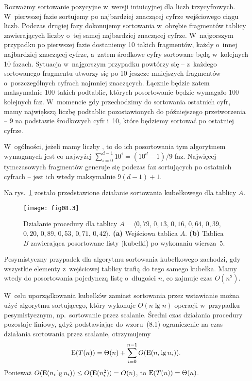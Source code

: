 \exercise %
Rozważmy sortowanie pozycyjne w~wersji intuicyjnej dla liczb trzycyfrowych. W~pierwszej fazie sortujemy po najbardziej znaczącej cyfrze wejściowego ciągu liczb. Podczas drugiej fazy dokonujemy sortowania w~obrębie fragmentów tablicy zawierających liczby o~tej samej najbardziej znaczącej cyfrze. W~najgorszym przypadku po pierwszej fazie dostaniemy 10 takich fragmentów, każdy o~innej najbardziej znaczącej cyfrze, a~zatem środkowe cyfry sortowane będą w~kolejnych 10 fazach. Sytuacja w~najgorszym przypadku powtórzy się -- z~każdego sortowanego fragmentu utworzy się po 10 jeszcze mniejszych fragmentów o~poszczególnych cyfrach najmniej znaczących. Łącznie będzie zatem maksymalnie 100 takich podtablic, których posortowanie będzie wymagało 100 kolejnych faz. W~momencie gdy przechodzimy do sortowania ostatnich cyfr, mamy największą liczbę podtablic pozostawionych do późniejszego przetworzenia -- 9 na podstawie środkowych cyfr i~10, które będziemy sortować po ostatniej cyfrze.

W~ogólności, jeżeli mamy liczby , to do ich posortowania tym algorytmem wymaganych jest co najwyżej $\sum_{i=0}^{d-1}10^i=(10^d-1)/9$ faz. Najwięcej tymczasowych fragmentów generuje się podczas faz sortujących po ostatnich cyfrach -- jest ich wtedy maksymalnie $9(d-1)+1$.


\exercise %
Na rys.~\ref{fig:8.4-1} zostało przedstawione działanie sortowania kubełkowego dla tablicy $A$.
\begin{figure}[ht]
	\begin{center}
		\texttt{[image: fig08.3]}
	\end{center}
	\caption{Działanie procedury  dla tablicy $A=\langle0{,}79$, $0{,}13$, $0{,}16$, $0{,}64$, $0{,}39$, $0{,}20$, $0{,}89$, $0{,}53$, $0{,}71$, $0{,}42\rangle$. {\sffamily\bfseries(a)} Wejściowa tablica $A$. {\sffamily\bfseries(b)} Tablica $B$ zawierająca posortowane listy (kubełki) po wykonaniu wiersza~5.} \label{fig:8.4-1}
\end{figure}

\exercise %
Pesymistyczny przypadek dla algorytmu sortowania kubełkowego zachodzi, gdy wszystkie elementy z~wejściowej tablicy trafią do tego samego kubełka. Mamy wtedy do posortowania pojedynczą listę o~długości $n$, co zajmuje czas $O(n^2)$.

W~celu uporządkowania kubełków zamiast sortowania przez wstawianie można użyć algorytmu sortującego, który wykonuje $O(n\lg n)$ operacji w~przypadku pesymistycznym, np.\ sortowanie przez scalanie. Średni czas działania procedury  pozostaje liniowy, gdyż podstawiając do wzoru~(8.1) ograniczenie na czas działania sortowania przez scalanie, otrzymujemy
\[
	\operatorname{E}(T(n)) = \Theta(n)+\sum_{i=0}^{n-1}O(\operatorname{E}(n_i\lg n_i)).
\]
Ponieważ $O(\operatorname{E}(n_i\lg n_i))\le O(\operatorname{E}(n_i^2))=O(n)$, to $\operatorname{E}(T(n))=\Theta(n)$.

